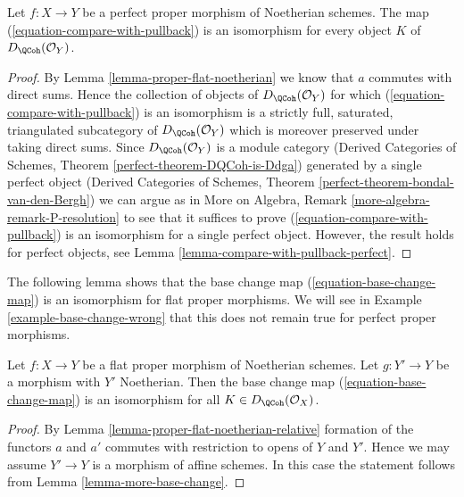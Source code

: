 \begin{lemma}
\label{lemma-compare-with-pullback-flat-proper-noetherian}
Let $f : X \to Y$ be a perfect proper morphism of Noetherian
schemes. The map (\ref{equation-compare-with-pullback}) is an isomorphism
for every object $K$ of $D_\QCoh(\mathcal{O}_Y)$.
\end{lemma}

\begin{proof}
By Lemma \ref{lemma-proper-flat-noetherian} we know that $a$ commutes
with direct sums. Hence the collection of objects of
$D_\QCoh(\mathcal{O}_Y)$ for which (\ref{equation-compare-with-pullback})
is an isomorphism is a strictly full, saturated, triangulated
subcategory of $D_\QCoh(\mathcal{O}_Y)$ which is moreover
preserved under taking direct sums. Since $D_\QCoh(\mathcal{O}_Y)$
is a module category (Derived Categories of Schemes, Theorem
\ref{perfect-theorem-DQCoh-is-Ddga}) generated by a single
perfect object (Derived Categories of Schemes, Theorem
\ref{perfect-theorem-bondal-van-den-Bergh})
we can argue as in
More on Algebra, Remark \ref{more-algebra-remark-P-resolution}
to see that it suffices to prove (\ref{equation-compare-with-pullback})
is an isomorphism for a single perfect object.
However, the result holds for perfect objects, see
Lemma \ref{lemma-compare-with-pullback-perfect}.
\end{proof}

\noindent
The following lemma shows that the base change map
(\ref{equation-base-change-map}) is an isomorphism
for flat proper morphisms. We will see in
Example \ref{example-base-change-wrong}
that this does not remain true for perfect proper morphisms.

\begin{lemma}
\label{lemma-proper-flat-base-change}
Let $f : X \to Y$ be a flat proper morphism of Noetherian schemes.
Let $g : Y' \to Y$ be a morphism with $Y'$ Noetherian. Then the base
change map (\ref{equation-base-change-map}) is an isomorphism
for all $K \in D_\QCoh(\mathcal{O}_X)$.
\end{lemma}

\begin{proof}
By Lemma \ref{lemma-proper-flat-noetherian-relative} formation of the
functors $a$ and $a'$ commutes with restriction to opens of $Y$ and $Y'$.
Hence we may assume $Y' \to Y$ is a morphism of affine schemes. In this
case the statement follows from Lemma \ref{lemma-more-base-change}.
\end{proof}

